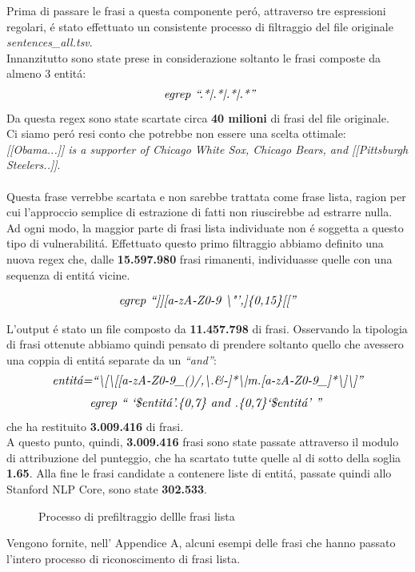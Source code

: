 \documentclass[twocolumn,10pt]{asme2ej}
\begin{document}
Prima di passare le frasi a questa componente per\'o, attraverso tre espressioni regolari, \'e stato effettuato un consistente processo di filtraggio del file originale \textit{sentences\_all.tsv}. \\Innanzitutto sono state prese in considerazione soltanto le frasi composte da almeno 3 entit\'a:
\begin{equation}
\small{\small{\textit{ egrep ``.*|.*|.*|.*''}}}
\end{equation}
Da questa  regex sono state scartate  circa \textbf{40 milioni} di frasi del file originale. \\Ci siamo per\'o resi conto che potrebbe non essere una scelta ottimale:\\

\textit{[[Obama...]] is a supporter of Chicago White Sox, Chicago Bears, and [[Pittsburgh Steelers..]]}.\\ \\
Questa frase verrebbe scartata e non sarebbe trattata come frase lista,  ragion per cui l'approccio semplice di estrazione di fatti non riuscirebbe ad estrarre nulla. Ad ogni modo, la maggior parte di frasi lista individuate non \'e soggetta a questo tipo di vulnerabilit\'a. Effettuato questo primo filtraggio abbiamo definito una nuova regex che, dalle \textbf{15.597.980} frasi rimanenti, individuasse quelle con una sequenza di entit\'a vicine. 

\begin{equation}
\small{\small{\textit{egrep ``]][a-zA-Z0-9 \textbackslash "',]\{0,15\}[[''}}}
\end{equation}

L'output \'e stato un file composto da \textbf{11.457.798} di frasi. Osservando la tipologia di frasi ottenute abbiamo quindi pensato di prendere soltanto quello che avessero una coppia di entit\'a separate da un \textit{``and''}:
\begin{equation}
\small{\small{\textit{entit\'a=``\textbackslash[\textbackslash[[a-zA-Z0-9\_()/,\textbackslash  .\&-]*\textbackslash|m.[a-zA-Z0-9\_]*\textbackslash]\textbackslash]''}}}
\end{equation}
\begin{equation}
\small{\small{\textit{egrep `` `\$entit\'a'.\{0,7\} and .\{0,7\}`\$entit\'a' ''
}}}
\end{equation}
che ha restituito \textbf{3.009.416} di frasi.\\
A questo punto, quindi,  \textbf{3.009.416} frasi sono state passate attraverso il modulo di attribuzione del punteggio, che ha scartato tutte quelle al di sotto della soglia \textbf{1.65}. Alla fine le frasi candidate a contenere liste di entit\'a, passate quindi allo Stanford NLP Core, sono state \textbf{302.533}.
\begin{figure} 
\centerline{}
\caption{Processo di prefiltraggio dellle frasi lista}
\label{step1.ps}
\end{figure}
Vengono fornite, nell' Appendice A, alcuni esempi delle frasi che hanno passato l'intero processo di riconoscimento di frasi lista.
\end{document}
